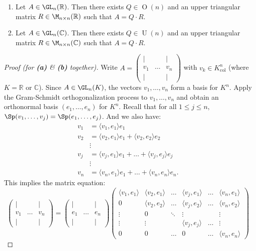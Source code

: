 \begin{theorem}
\label{thm:qr_decomposition_invertible}
\begin{enumerate}
    \item Let $A \in \GL_n(\mathbb{R})$. Then there exists $Q \in \operatorname{O}(n)$ and an upper triangular matrix $R \in \M_{n \times n}(\mathbb{R})$ such that $A = Q \cdot R$.
    \item Let $A \in \GL_n(\mathbb{C})$. Then there exists $Q \in \operatorname{U}(n)$ and an upper triangular matrix $R \in \M_{n \times n}(\mathbb{C})$ such that $A = Q \cdot R$.
\end{enumerate}
\end{theorem}

\begin{proof}[Proof (for \textbf{(a)} \& \textbf{(b)} together)]
Write $A = \begin{pmatrix} | & & | \\ v_1 & \dots & v_n \\ | & & | \end{pmatrix}$ with $v_k \in K_{\text{col}}^n$ (where $K = \mathbb{R}$ or $\mathbb{C}$).
Since $A \in \GL_n(K)$, the vectors $v_1, \dots, v_n$ form a basis for $K^n$.
Apply the Gram-Schmidt orthogonalization process to $v_1, \dots, v_n$ and obtain an orthonormal basis $(e_1, \dots, e_n)$ for $K^n$.
Recall that for all $1 \leq j \leq n$, $\Sp(v_1, \dots, v_j) = \Sp(e_1, \dots, e_j)$.
And we also have:
\begin{align*}
    v_1 &= \langle v_1, e_1 \rangle e_1 \\
    v_2 &= \langle v_2, e_1 \rangle e_1 + \langle v_2, e_2 \rangle e_2 \\
    &\vdots \\
    v_j &= \langle v_j, e_1 \rangle e_1 + \dots + \langle v_j, e_j \rangle e_j \\
    &\vdots \\
    v_n &= \langle v_n, e_1 \rangle e_1 + \dots + \langle v_n, e_n \rangle e_n.
\end{align*}
This implies the matrix equation:
\[ \begin{pmatrix} | & & | \\ v_1 & \dots & v_n \\ | & & | \end{pmatrix} = \begin{pmatrix} | & & | \\ e_1 & \dots & e_n \\ | & & | \end{pmatrix} \begin{pmatrix} \langle v_1, e_1 \rangle & \langle v_2, e_1 \rangle & \dots & \langle v_j, e_1 \rangle & \dots & \langle v_n, e_1 \rangle \\ 0 & \langle v_2, e_2 \rangle & \dots & \langle v_j, e_2 \rangle & \dots & \langle v_n, e_2 \rangle \\ \vdots & 0 & \ddots & \vdots & & \vdots \\ \vdots & \vdots & & \langle v_j, e_j \rangle & \dots & \vdots \\ 0 & 0 & \dots & 0 & \dots & \langle v_n, e_n \rangle \end{pmatrix} \]

\end{proof}
